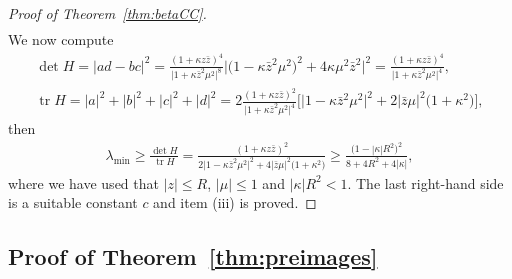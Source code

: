 \documentclass[pdftex]{sigma}
\numberwithin{equation}{section}
\theoremstyle{definition}
\newcommand{\1}{{\bf 1}}
\newcommand \zbar { \bar{z}}
\begin{document}
\begin{proof}[Proof of Theorem~\ref{thm:betaCC}]
\begin{align*}
	\end{align*}
	We now compute
	\begin{gather*}
		\det H = |ad-bc|^2 = \frac{(1+\kappa z\zbar)^4}{\big|1+\kappa\zbar^2\mu^2\big|^8} \big|\bigl(1-\kappa\zbar^2\mu^2\bigr)^2 + 4\kappa \mu^2 \zbar^2\big|^2 = \frac{(1+\kappa z\zbar)^4}{\big|1+\kappa\zbar^2 \mu^2\big|^4}, \\
		\operatorname{tr} H = |a|^2 + |b|^2 + |c|^2 + |d|^2 = 2 \frac{(1+\kappa z\zbar)^2}{\big|1+\kappa\zbar^2 \mu^2\big|^4} \big[ \big|1-\kappa\zbar^2\mu^2\big|^2 + 2|\zbar\mu|^2 \bigl(1+\kappa^2\bigr) \big],
	\end{gather*}
	then
	\begin{align*}
		\lambda_{\min} \ge \frac{\det H}{\operatorname{tr} H} = \frac{(1+\kappa z\zbar)^2}{2\big|1-\kappa\zbar^2\mu^2\big|^2 + 4 |\zbar\mu|^2 \bigl(1+ \kappa^2\bigr)} \ge \frac{\bigl(1-|\kappa| R^2\bigr)^2}{8+4 R^2+4|\kappa|},
	\end{align*}
	where we have used that $|z|\le R$, $|\mu|\le 1$ and $|\kappa|R^2<1$. The last right-hand side is a suitable constant $c$ and item (iii) is proved.	
\end{proof}


\subsection[Proof of Theorem 4.3]{Proof of Theorem~\ref{thm:preimages}} \label{ssec:proofpreimages}
\end{document}
